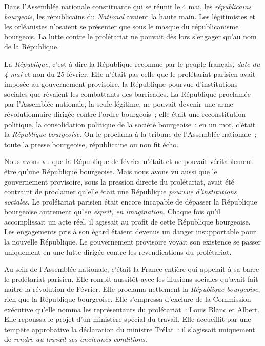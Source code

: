 \documentclass[french,twoside]{book} %
\begin{document}
Dans l’Assemblée nationale constituante qui se réunit le 4 mai, les \emph{républicains bourgeois}, les républicains du \emph{National} avaient la haute main. Les légitimistes et les orléanistes n’osaient se présenter que sous le masque du républicanisme bourgeois. La lutte contre le prolétariat ne pouvait dès lors s’engager qu’au nom de la République.\par
La \emph{République}, c’est-à-dire la République reconnue par le peuple français, \emph{date du 4 mai} et non du 25 février. Elle n’était pas celle que le prolétariat parisien avait imposée au gouvernement provisoire, la République pourvue d’institutions sociales que rêvaient les combattants des barricades. La République proclamée par l’Assemblée nationale, la seule légitime, ne pouvait devenir une arme révolutionnaire dirigée contre l’ordre bourgeois ; elle était une reconstitution politique, la consolidation politique de la société bourgeoise : en un mot, c’était la \emph{République bourgeoise}. On le proclama à la tribune de l’Assemblée nationale ; toute la presse bourgeoise, républicaine ou non fit écho.\par
Nous avons vu que la République de février n’était et ne pouvait véritablement être qu’une République bourgeoise. Mais nous avons vu aussi que le gouvernement provisoire, sous la pression directe du prolétariat, avait été contraint de proclamer qu’elle était une République \emph{pourvue d’institutions sociales}. Le prolétariat parisien était encore incapable de dépasser la République bourgeoise autrement qu’\emph{en esprit, en imagination}. Chaque fois qu’il accomplissait un acte réel, il agissait au profit de cette République bourgeoise. Les engagements pris à son égard étaient devenus un danger insupportable pour la nouvelle République. Le gouvernement provisoire voyait son existence se passer uniquement en une lutte dirigée contre les revendications du prolétariat.\par
Au sein de l’Assemblée nationale, c’était la France entière qui appelait à sa barre le prolétariat parisien. Elle rompit aussitôt avec les illusions sociales qu’avait fait naître la révolution de Février. Elle proclama nettement la \emph{République bourgeoise}, rien que la République bourgeoise. Elle s’empressa d’exclure de la Commission exécutive qu’elle nomma les représentants du prolétariat : Louis Blanc et Albert. Elle repoussa le projet d’un ministère spécial du travail. Elle accueillit par une tempête approbative la déclaration du ministre Trélat : il s’agissait uniquement de \emph{rendre au travail ses anciennes conditions}.\par
\end{document}
